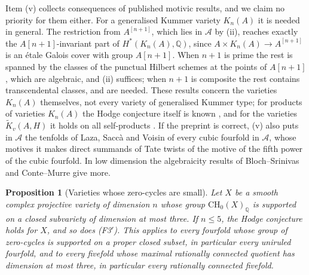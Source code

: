 \documentclass[11pt,reqno]{amsart}
\theoremstyle{plain}
\newtheorem{proposition}[theorem]{Proposition}
\theoremstyle{definition}
\theoremstyle{remark}
\newcommand{\QQ}{\mathbb{Q}}
\begin{document}
Item (v) collects consequences of published motivic results, and we claim no
priority for them either. For a generalised Kummer variety $K_{n}(A)$ it is
needed in general. The restriction from $A^{[n+1]}$, which lies in
$\mathcal{A}$ by (ii), reaches exactly the $A[n+1]$-invariant part of
$H^{*}(K_{n}(A),\QQ)$, since $A\times K_{n}(A)\to A^{[n+1]}$ is an \'etale
Galois cover with group $A[n+1]$. When $n+1$ is prime the rest is spanned by
the classes of the punctual Hilbert schemes at the points of $A[n+1]$, which
are algebraic, and (ii) suffices; when $n+1$ is composite the rest contains
transcendental classes, and \cite{Xu15,FTV19} are needed. These results
concern the varieties $K_{n}(A)$ themselves, not every variety of
generalised Kummer type; for products of varieties $K_{n}(A)$ the Hodge
conjecture itself is known \cite[Theorem~3.3]{Xu15}, and for the varieties
$\widetilde K_{v}(A,H)$ it holds on all self-products
\cite[Corollary~1.2]{Flo23}. If the
preprint \cite{Ped26} is correct, (v) also puts in $\mathcal{A}$ the tenfolds
of Laza, Sacc\`a and Voisin of every cubic fourfold in $\mathcal{A}$, whose
motives it makes direct summands of Tate twists of the motive of the fifth
power of the cubic fourfold. In low dimension the algebraicity results of
Bloch--Srinivas and Conte--Murre give more.

\begin{proposition}[Varieties whose zero-cycles are small]
\label{prop:f3primesmall}
Let $X$ be a smooth complex projective variety of dimension $n$ whose group
$\mathrm{CH}_{0}(X)_{\QQ}$ is supported on a closed subvariety of dimension at
most three. If $n\le5$, the Hodge conjecture holds for $X$, and so does
\textup{(F3$'$)}. This applies to every fourfold whose group of zero-cycles
is supported on a proper closed subset, in particular every uniruled
fourfold, and to every fivefold whose maximal rationally connected quotient
has dimension at most three, in particular every rationally connected
fivefold.
\end{proposition}
\end{document}
